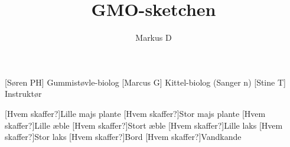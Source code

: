 \documentclass[a4paper,12pt]{article}
\title{GMO-sketchen}
\author{Markus D}
\begin{document}
\maketitle




\begin{roles}
	[Søren PH] Gummistøvle-biolog
	[Marcus G] Kittel-biolog (Sanger n)
	[Stine T] Instruktør
\end{roles}


\begin{props}
	[Hvem skaffer?]Lille majs plante
	[Hvem skaffer?]Stor majs plante
	[Hvem skaffer?]Lille æble
	[Hvem skaffer?]Stort æble
	[Hvem skaffer?]Lille laks
	[Hvem skaffer?]Stor laks
	[Hvem skaffer?]Bord
	[Hvem skaffer?]Vandkande 
\end{props}
\end{document}
